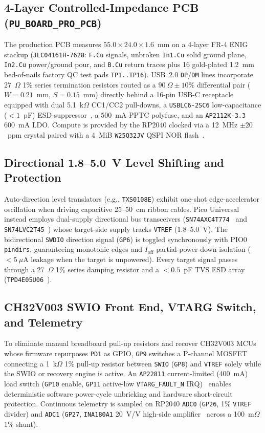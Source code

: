 \documentclass[journal]{IEEEtran}
\begin{document}
\subsection{4-Layer Controlled-Impedance PCB (\texttt{PU\_BOARD\_PRO\_PCB})}
The production PCB measures $55.0\times 24.0\times 1.6$~mm on a 4-layer FR-4 ENIG stackup (\texttt{JLC04161H-7628}: \texttt{F.Cu} signals, unbroken \texttt{In1.Cu} solid ground plane, \texttt{In2.Cu} power/ground pour, and \texttt{B.Cu} return traces plus 16 gold-plated 1.2~mm bed-of-nails factory QC test pads \texttt{TP1..TP16}). USB~2.0 \texttt{DP}/\texttt{DM} lines incorporate 27~$\Omega$ 1\% series termination resistors routed as a $90~\Omega\pm 10\%$ differential pair ($W=0.21$~mm, $S=0.15$~mm) directly behind a 16-pin USB-C receptacle equipped with dual 5.1~k$\Omega$ CC1/CC2 pull-downs, a \texttt{USBLC6-2SC6} low-capacitance ($<1$~pF) ESD suppressor~\cite{st_usblc6_ds}, a 500~mA PPTC polyfuse, and an \texttt{AP2112K-3.3} 600~mA LDO. Compute is provided by the RP2040 clocked via a 12~MHz $\pm 20$~ppm crystal paired with a 4~MiB \texttt{W25Q32JV} QSPI NOR flash~\cite{winbond_w25q32_ds}.

\subsection{Directional 1.8--5.0~V Level Shifting and Protection}
Auto-direction level translators (e.g., \texttt{TXS0108E}) exhibit one-shot edge-accelerator oscillation when driving capacitive 25--50~cm ribbon cables. Pico Universal instead employs dual-supply directional bus transceivers (\texttt{SN74AXC4T774}~\cite{ti_sn74axc4t774_ds} and \texttt{SN74LVC2T45}~\cite{ti_sn74lvc2t45_ds}) whose target-side supply tracks \texttt{VTREF} (1.8--5.0~V). The bidirectional \texttt{SWDIO} direction signal (\texttt{GP6}) is toggled synchronously with PIO0 \texttt{pindirs}, guaranteeing monotonic edges and $I_{\text{off}}$ partial-power-down isolation ($<5~\mu$A leakage when the target is unpowered). Every target signal passes through a 27~$\Omega$ 1\% series damping resistor and a $<0.5$~pF TVS ESD array (\texttt{TPD4E05U06}~\cite{ti_tpd4e05u06_ds}).

\subsection{CH32V003 SWIO Front End, VTARG Switch, and Telemetry}
To eliminate manual breadboard pull-up resistors and recover CH32V003 MCUs whose firmware repurposes \texttt{PD1} as GPIO, \texttt{GP9} switches a P-channel MOSFET connecting a 1~k$\Omega$ 1\% pull-up resistor between \texttt{SWIO} (\texttt{GP8}) and \texttt{VTREF} solely while the SWIO or recovery engine is active. An \texttt{AP22811} current-limited (400~mA) load switch (\texttt{GP10} enable, \texttt{GP11} active-low \texttt{VTARG\_FAULT\_N} IRQ)~\cite{diodes_ap22811_ds} enables deterministic software power-cycle unbricking and hardware short-circuit protection. Continuous telemetry is sampled on RP2040 \texttt{ADC0} (\texttt{GP26}, 1\% \texttt{VTREF} divider) and \texttt{ADC1} (\texttt{GP27}, \texttt{INA180A1} 20~V/V high-side amplifier~\cite{ti_ina180_ds} across a 100~m$\Omega$ 1\% shunt).
\end{document}
